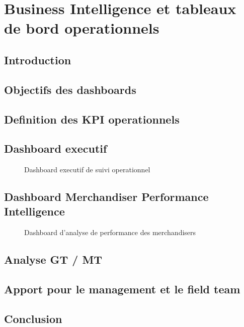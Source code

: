 \chapter{Business Intelligence et tableaux de bord operationnels}

\section{Introduction}

\section{Objectifs des dashboards}

\section{Definition des KPI operationnels}

\section{Dashboard executif}
\begin{figure}[htbp]
    \centering
    \caption{Dashboard executif de suivi operationnel}
    \label{fig:dashboard_executif}
\end{figure}

\section{Dashboard Merchandiser Performance Intelligence}
\begin{figure}[htbp]
    \centering
    \caption{Dashboard d'analyse de performance des merchandisers}
    \label{fig:dashboard_merch}
\end{figure}

\section{Analyse GT / MT}

\section{Apport pour le management et le field team}

\section{Conclusion}


